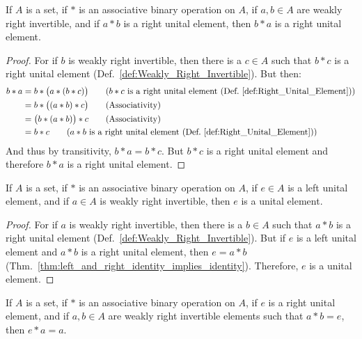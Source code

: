     \begin{theorem}
        \label{thm:ab_right_unital_implies_ba_right_unital}%
        If $A$ is a set, if $*$ is an associative binary operation on $A$, if
        $a,b\in{A}$ are weakly right invertible, and if $a*b$ is a right unital
        element, then $b*a$ is a right unital element.
    \end{theorem}
    \begin{proof}
        For if $b$ is weakly right invertible, then there is a $c\in{A}$ such
        that $b*c$ is a right unital element
        (Def.~\ref{def:Weakly_Right_Invertible}). But then:
        \begin{align}
            b*a&=b*\big(a*(b*c)\big)
            \tag{$b*c$ is a right unital element %
                 (Def.~\ref{def:Right_Unital_Element})}\\
            &=b*\big((a*b)*c\big)
            \tag{Associativity}\\
            &=\big(b*(a*b)\big)*c
            \tag{Associativity}\\
            &=b*c
            \tag{$a*b$ is a right unital element %
                 (Def.~\ref{def:Right_Unital_Element})}
        \end{align}
        And thus by transitivity, $b*a=b*c$. But $b*c$ is a right unital element
        and therefore $b*a$ is a right unital element.
    \end{proof}
    \begin{theorem}
        If $A$ is a set, if $*$ is an associative binary operation on $A$, if
        $e\in{A}$ is a left unital element, and if $a\in{A}$ is weakly right
        invertible, then $e$ is a unital element.
    \end{theorem}
    \begin{proof}
        For if $a$ is weakly right invertible, then there is a $b\in{A}$ such
        that $a*b$ is a right unital element
        (Def.~\ref{def:Weakly_Right_Invertible}). But if $e$ is a left unital
        element and $a*b$ is a right unital element, then $e=a*b$
        (Thm.~\ref{thm:left_and_right_identity_implies_identity}). Therefore,
        $e$ is a unital element.
    \end{proof}
    \begin{theorem}
        \label{thm:right_unit_with_right_inv_almost_implies_unit}%
        If $A$ is a set, if $*$ is an associative binary operation on $A$, if
        $e$ is a right unital element, and if $a,b\in{A}$ are weakly right
        invertible elements such that $a*b=e$, then $e*a=a$.
    \end{theorem}

